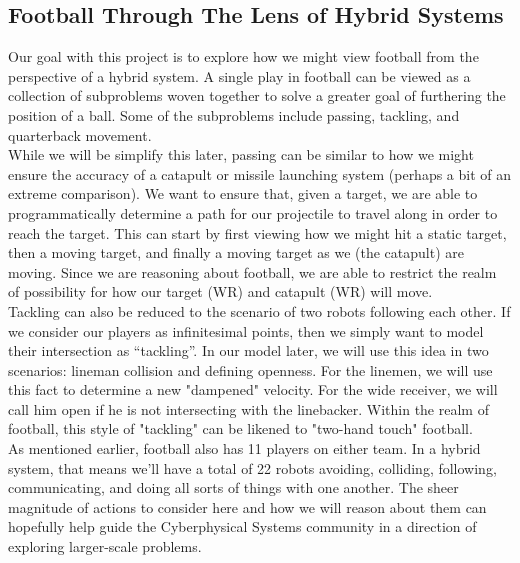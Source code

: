 \subsection{Football Through The Lens of Hybrid Systems}

\quad Our goal with this project is to explore how we might view football from the perspective of a hybrid system. A single play in football can be viewed as a collection of subproblems woven together to solve a greater goal of furthering the position of a ball. Some of the subproblems include passing, tackling, and quarterback movement. \\

While we will be simplify this later, passing can be similar to how we might ensure the accuracy of a catapult or missile launching system (perhaps a bit of an extreme comparison). We want to ensure that, given a target, we are able to programmatically determine a path for our projectile to travel along in order to reach the target. This can start by first viewing how we might hit a static target, then a moving target, and finally a moving target as we (the catapult) are moving. Since we are reasoning about football, we are able to restrict the realm of possibility for how our target (WR) and catapult (WR) will move. \\

Tackling can also be reduced to the scenario of two robots following each other. If we consider our players as infinitesimal points, then we simply want to model their intersection as “tackling”. In our model later, we will use this idea in two scenarios: lineman collision and defining openness. For the linemen, we will use this fact to determine a new "dampened" velocity. For the wide receiver, we will call him open if he is not intersecting with the linebacker. Within the realm of football, this style of "tackling" can be likened to "two-hand touch" football. \\

As mentioned earlier, football also has 11 players on either team. In a hybrid system, that means we'll have a total of 22 robots avoiding, colliding, following, communicating, and doing all sorts of things with one another. The sheer magnitude of actions to consider here and how we will reason about them can hopefully help guide the Cyberphysical Systems community in a direction of exploring larger-scale problems.
